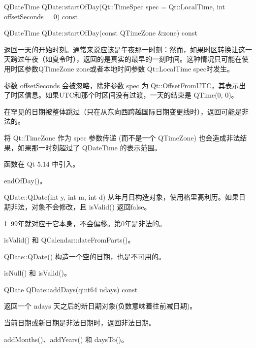 \splitLine

QDateTime QDate::startOfDay(Qt::TimeSpec spec = Qt::LocalTime, int offsetSeconds = 0) const

QDateTime QDate::startOfDay(const QTimeZone \&zone) const

返回一天的开始时刻。通常来说应该是午夜那一时刻：然而，如果时区转换让这一天跨过午夜（如夏令时），返回的是真实的最早的一刻时间。这种情况只可能在使用时区参数QTimeZone zone或者本地时间参数 Qt::LocalTime spec时发生。

参数 offsetSeconds 会被忽略，除非参数 spec 为 Qt::OffsetFromUTC，其表示出了时区信息。如果UTC和那个时区间没有过渡，一天的结束是 QTime(0, 0)。

在罕见的日期被整体跳过（只在从东向西跨越国际日期变更线时），返回可能是非法的。

将 Qt::TimeZone 作为 spec 参数传递 (而不是一个 QTimeZone) 也会造成非法结果，如果那一时刻超过了 QDateTime 的表示范围。

函数在 Qt 5.14 中引入。

\begin{notice}[另请参阅]
endOfDay()。
\end{notice}

\splitLine

QDate::QDate(int y, int m, int d)
从年月日构造对象，使用格里高利历。如果日期非法，对象不会修改，且 isValid() 返回false。


\begin{notice}
1~99年就对应于它本身，不会偏移。第0年是非法的。
\end{notice}


\begin{notice}[另请参阅]
isValid() 和 QCalendar::dateFromParts()。
\end{notice}



\splitLine

QDate::QDate()
构造一个空的日期，也是不可用的。


\begin{notice}[另请参阅]
isNull() 和 isValid()。
\end{notice}

\splitLine

QDate QDate::addDays(qint64 ndays) const

返回一个 ndays 天之后的新日期对象(负数意味着往前减日期)。

当前日期或新日期是非法日期时，返回非法日期。



\begin{notice}[另请参阅]
addMonths()、addYears() 和 daysTo()。
\end{notice}

